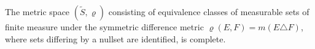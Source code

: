 The metric space $(\tilde{S}, \varrho)$ consisting of equivalence classes of measurable sets of finite measure under the symmetric difference metric $\varrho(E, F) = m(E \triangle F)$, where sets differing by a nullset are identified, is complete.